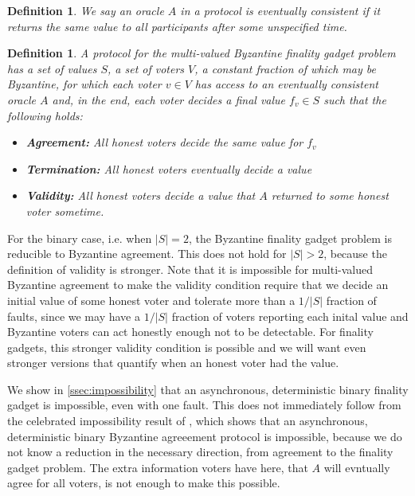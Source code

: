 \documentclass{article}
\newtheorem{definition}[theorem]{Definition}
\begin{document}
\begin{definition}
We say an oracle $A$ in a protocol is {\em eventually consistent} if it returns the same value to all participants after some unspecified time.
\end{definition}


\begin{definition} A protocol for the {\em multi-valued Byzantine finality gadget problem} has a set of values $S$, a set of voters $V$, a constant fraction of which may be Byzantine, for which each voter $v \in V$ has access to an eventually consistent oracle $A$ and, in the end, each voter decides a final value $f_v \in S$ such that the following holds:

\begin{itemize}
\item {\bf Agreement:} All honest voters decide the same value for $f_v$
\item {\bf Termination:} All honest voters eventually decide a value
\item {\bf Validity:} All honest voters decide a value that $A$ returned to some honest voter sometime.
\end{itemize}

\end{definition}

For the binary case, i.e. when $|S|=2$, the Byzantine finality gadget problem is reducible to Byzantine agreement. This does not hold for $|S| > 2$, because the definition of validity is stronger. Note that it is impossible for multi-valued Byzantine agreement to make the validity condition require that we decide an initial value of some honest voter and tolerate more than a $1/|S|$ fraction of faults, since we may have a $1/|S|$ fraction of voters reporting each inital value and Byzantine voters can act honestly enough not to be detectable. For finality gadgets, this stronger validity condition is possible and we will want even stronger versions that quantify when an honest voter had the value.

We show in \ref{ssec:impossibility} that an asynchronous, deterministic binary finality gadget is impossible, even with one fault. This does not immediately follow from the celebrated impossibility result of \cite{flp}, which shows that an asynchronous, deterministic binary Byzantine agreeement protocol is impossible,  because we do not know a reduction in the necessary direction, from agreement to the finality gadget problem. The extra information voters have here, that $A$ will evntually agree for all voters, is not enough to make this possible.
\end{document}
